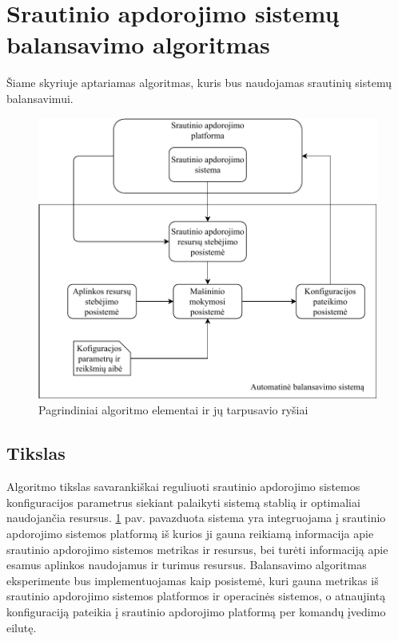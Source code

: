\documentclass{VUMIFPSbakalaurinis}
\begin{document}
\section{Srautinio apdorojimo sistemų balansavimo algoritmas}
Šiame skyriuje aptariamas algoritmas, kuris bus naudojamas srautinių sistemų balansavimui. 
\begin{figure}[H]
    \includegraphics[width=15cm]{img/BalansavimoDiagrama.pdf}
    \caption{Pagrindiniai algoritmo elementai ir jų tarpusavio ryšiai}
    \label{balansavimo_sistema}
\end{figure} 

\subsection{Tikslas}
Algoritmo tikslas savarankiškai reguliuoti srautinio apdorojimo sistemos konfiguracijos parametrus siekiant palaikyti sistemą stablią ir optimaliai naudojančia resursus. \ref{balansavimo_sistema} pav. pavazduota sistema yra integruojama į srautinio apdorojimo sistemos platformą iš kurios ji gauna reikiamą informacija apie srautinio apdorojimo sistemos metrikas ir resursus, bei turėti informaciją apie esamus aplinkos naudojamus ir turimus resursus. Balansavimo algoritmas eksperimente bus implementuojamas kaip posistemė, kuri gauna metrikas iš srautinio apdorojimo sistemos platformos ir operacinės sistemos, o atnaujintą konfiguraciją pateikia į srautinio apdorojimo platformą per komandų įvedimo eilutę.
\end{document}
